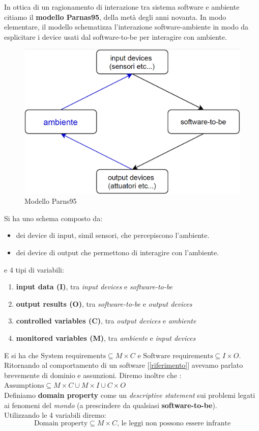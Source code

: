 In ottica di un ragionamento di interazione tra sistema software e ambiente citiamo il \textbf{modello Parnas95}, della metà degli anni novanta. In modo elementare, il modello schematizza l’interazione software-ambiente in modo da esplicitare i device usati dal software-to-be per interagire con ambiente. 
\begin{figure}[H]
    \centering
    \includegraphics[scale= 0.25]{Imm/re_cose.PNG}
    \caption{Modello Parns95}
    \label{fig:parnas}
\end{figure}
Si ha uno schema composto da:
\begin{itemize}
    \item dei device di input, simil sensori, che percepiscono l’ambiente.
    \item dei device di output che permettono di interagire con l’ambiente.
\end{itemize}
e 4 tipi di variabili:
\begin{enumerate}
  \item \textbf{input data (I)}, tra \textit{input devices} e \textit{software-to-be}
  \item \textbf{output results (O)}, tra \textit{software-to-be} e \textit{output devices}
  \item \textbf{controlled variables  (C)}, tra \textit{output devices} e \textit{ambiente}
  \item \textbf{monitored variables (M)}, tra \textit{ambiente} e \textit{input devices}
\end{enumerate}
E si ha che $\mbox{System requirements}\subseteq M\times C$ e $\mbox{Software requirements}\subseteq I\times O$. Ritornando al comportamento di un software [\ref{riferimento}] avevamo parlato brevemente di dominio e assunzioni. Diremo inoltre che :\\
$\mbox{Assumptions}\subseteq M\times C\cup M\times I \cup C\times O$ \\
Definiamo \textbf{domain property} come un \textit{descriptive statement} sui problemi legati ai fenomeni del \textit{mondo} (a prescindere da qualsiasi \textbf{software-to-be}).\\ Utilizzando le 4 variabili diremo:
  $$\mbox{Domain property}\subseteq M\times C \mbox{, le leggi non possono essere infrante}$$

